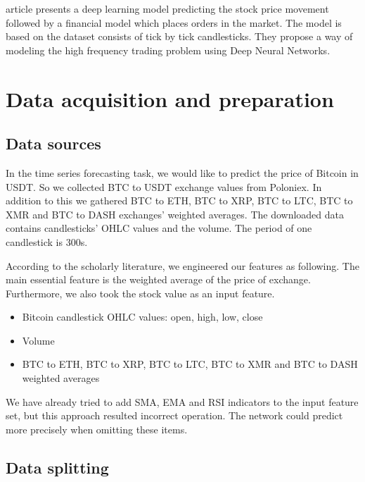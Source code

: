 \documentclass[conference]{IEEEtran}
\begin{document}
\cite{b0} article presents a deep learning model predicting the stock price movement followed by a financial model which places orders in the market. The model is based on the dataset consists of tick by tick candlesticks. They propose a way of modeling the high frequency trading problem using Deep Neural Networks.

\section{Data acquisition and preparation}

\subsection{Data sources}

In the time series forecasting task, we would like to predict the price of Bitcoin in USDT. So we collected BTC to USDT exchange values from Poloniex. In addition to this we gathered BTC to ETH, BTC to XRP, BTC to LTC, BTC to XMR and BTC to DASH exchanges' weighted averages. The downloaded data contains candlesticks' OHLC values and the volume. The period of one candlestick is 300s.

According to the scholarly literature, we engineered our features as following. The main essential feature is the weighted average of the price of exchange. Furthermore, we also took the stock value as an input feature.

\vspace{3px}

\begin{itemize}
  \item Bitcoin candlestick OHLC values: open, high, low, close
  \item Volume
  \item BTC to ETH, BTC to XRP, BTC to LTC, BTC to XMR and BTC to DASH weighted averages
\end{itemize}

\vspace{3px}

We have already tried to add SMA, EMA and RSI indicators to the input feature set, but this approach resulted incorrect operation. The network could predict more precisely when omitting these items.

\subsection{Data splitting}
\end{document}

